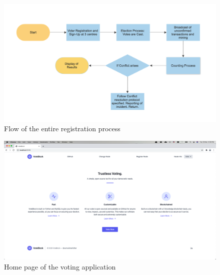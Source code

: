 \documentclass{article}
\begin{document}
    \begin{figure}[h]
        \centering
        \includegraphics[width=1\textwidth]{complete_voting_procedure.png}
        \caption{Flow of the entire registration process}
    \end{figure}
    \begin{figure}[h]
        \centering
        \includegraphics[width=1\textwidth]{home_page.png}
        \caption{Home page of the voting application}
    \end{figure}
\end{document}
